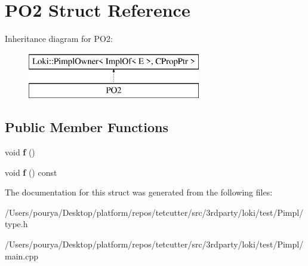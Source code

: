 \hypertarget{structPO2}{}\section{P\+O2 Struct Reference}
\label{structPO2}
Inheritance diagram for P\+O2\+:\begin{figure}[H]
\begin{center}
\leavevmode
\includegraphics[height=2.000000cm]{structPO2}
\end{center}
\end{figure}
\subsection*{Public Member Functions}
\begin{DoxyCompactItemize}
\item 
\hypertarget{structPO2_aa9b87bdacbf094078bcfbdb827237019}{}void {\bfseries f} ()\label{structPO2_aa9b87bdacbf094078bcfbdb827237019}

\item 
\hypertarget{structPO2_ad65c4f8bb74de60668ceb439be76d551}{}void {\bfseries f} () const \label{structPO2_ad65c4f8bb74de60668ceb439be76d551}

\end{DoxyCompactItemize}


The documentation for this struct was generated from the following files\+:\begin{DoxyCompactItemize}
\item 
/\+Users/pourya/\+Desktop/platform/repos/tetcutter/src/3rdparty/loki/test/\+Pimpl/type.\+h\item 
/\+Users/pourya/\+Desktop/platform/repos/tetcutter/src/3rdparty/loki/test/\+Pimpl/main.\+cpp\end{DoxyCompactItemize}
